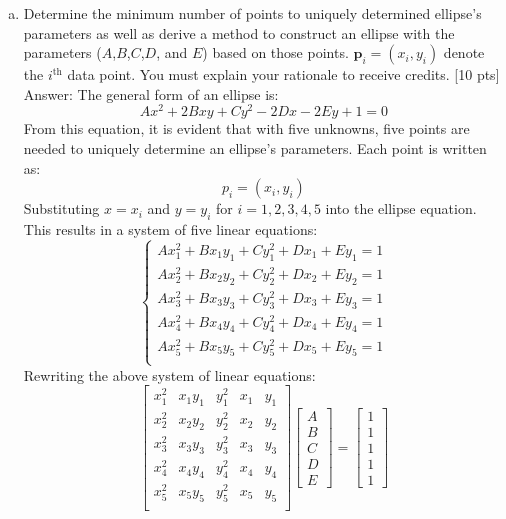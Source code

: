 \begin{enumerate}[a.)]  
\item Determine the minimum number of points to uniquely determined ellipse's parameters as well as derive a method to construct an ellipse with the parameters ($A$,$B$,$C$,$D$, and $E$) based on those points. $\mathbf{p}_i=(x_i,y_i)$ denote the $i^\text{th}$ data point. You must explain your rationale to receive credits. [10 pts]
\[\]
Answer:
The general form of an ellipse is:
\begin{equation*}
    Ax^2+2Bxy+Cy^2-2Dx-2Ey+1=0
\end{equation*}
From this equation, it is evident that with five unknowns, five points are needed to uniquely determine an ellipse's parameters.
Each point is written as:
\[
p_i = (x_i, y_i)
\]
Substituting \(x = x_i\) and \(y = y_i\) for \(i = 1, 2, 3, 4, 5\) into the ellipse equation.
This results in a system of five linear equations:
\[
\begin{cases}
A x_1^2 + B x_1 y_1 + C y_1^2 + D x_1 + E y_1 = 1 \\
A x_2^2 + B x_2 y_2 + C y_2^2 + D x_2 + E y_2 = 1 \\
A x_3^2 + B x_3 y_3 + C y_3^2 + D x_3 + E y_3 = 1 \\
A x_4^2 + B x_4 y_4 + C y_4^2 + D x_4 + E y_4 = 1 \\
A x_5^2 + B x_5 y_5 + C y_5^2 + D x_5 + E y_5 = 1 \\
\end{cases}
\]
Rewriting the above system of linear equations:
\[
\begin{bmatrix}
x_1^2 & x_1 y_1 & y_1^2 & x_1 & y_1 \\
x_2^2 & x_2 y_2 & y_2^2 & x_2 & y_2 \\
x_3^2 & x_3 y_3 & y_3^2 & x_3 & y_3 \\
x_4^2 & x_4 y_4 & y_4^2 & x_4 & y_4 \\
x_5^2 & x_5 y_5 & y_5^2 & x_5 & y_5 \\
\end{bmatrix}
\begin{bmatrix}
A \\ B \\ C \\ D \\ E
\end{bmatrix}
=
\begin{bmatrix}
1 \\ 1 \\ 1 \\ 1 \\ 1

\end{bmatrix}\]
\end{enumerate}
